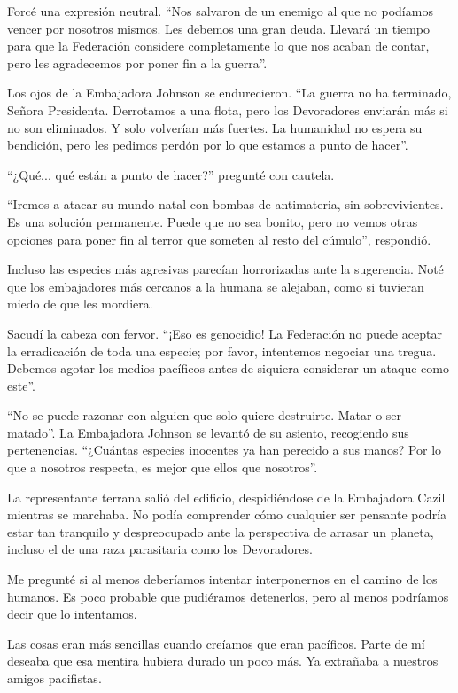 Forcé una expresión neutral. ``Nos salvaron de un enemigo al que no podíamos vencer por nosotros mismos. Les debemos una gran deuda. Llevará un tiempo para que la Federación considere completamente lo que nos acaban de contar, pero les agradecemos por poner fin a la guerra''.

Los ojos de la Embajadora Johnson se endurecieron. ``La guerra no ha terminado, Señora Presidenta. Derrotamos a una flota, pero los Devoradores enviarán más si no son eliminados. Y solo volverían más fuertes. La humanidad no espera su bendición, pero les pedimos perdón por lo que estamos a punto de hacer''.

``¿Qué... qué están a punto de hacer?'' pregunté con cautela.

``Iremos a atacar su mundo natal con bombas de antimateria, sin sobrevivientes. Es una solución permanente. Puede que no sea bonito, pero no vemos otras opciones para poner fin al terror que someten al resto del cúmulo'', respondió.

Incluso las especies más agresivas parecían horrorizadas ante la sugerencia. Noté que los embajadores más cercanos a la humana se alejaban, como si tuvieran miedo de que les mordiera.

Sacudí la cabeza con fervor. ``¡Eso es genocidio! La Federación no puede aceptar la erradicación de toda una especie; por favor, intentemos negociar una tregua. Debemos agotar los medios pacíficos antes de siquiera considerar un ataque como este''.

``No se puede razonar con alguien que solo quiere destruirte. Matar o ser matado''. La Embajadora Johnson se levantó de su asiento, recogiendo sus pertenencias. ``¿Cuántas especies inocentes ya han perecido a sus manos? Por lo que a nosotros respecta, es mejor que ellos que nosotros''.

La representante terrana salió del edificio, despidiéndose de la Embajadora Cazil mientras se marchaba. No podía comprender cómo cualquier ser pensante podría estar tan tranquilo y despreocupado ante la perspectiva de arrasar un planeta, incluso el de una raza parasitaria como los Devoradores.

Me pregunté si al menos deberíamos intentar interponernos en el camino de los humanos. Es poco probable que pudiéramos detenerlos, pero al menos podríamos decir que lo intentamos.

Las cosas eran más sencillas cuando creíamos que eran pacíficos. Parte de mí deseaba que esa mentira hubiera durado un poco más. Ya extrañaba a nuestros amigos pacifistas.